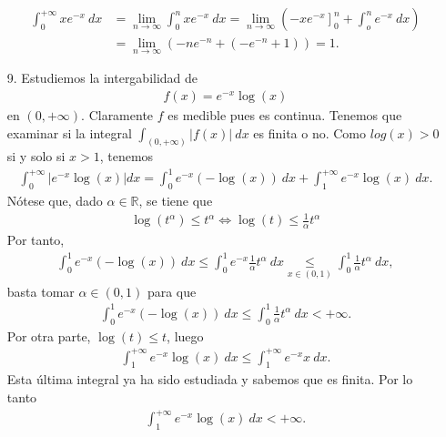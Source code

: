 \begin{ejemplo}
\begin{enumerate}
\begin{align*}
                  \int_{0}^{+\infty}{xe^{-x} \ dx} & = \lim_{n \to \infty}{\int_{0}^{n}{xe^{-x} \ dx}} = \lim_{n \to \infty} {\left( \left. -xe^{-x}\right]_0^n + \int_{o}^{n}{e^{-x} \ dx} \right)} \\
                                                   & = \lim_{n \to \infty}{(-ne^{-n} + (-e^{-n}+1))} = 1.
              \end{align*}
        \item[9.] Estudiemos la intergabilidad de
              \begin{align*}
                  f(x) = e^{-x}\log(x)
              \end{align*}
              en $(0,+\infty)$. Claramente $f$ es medible pues es continua. Tenemos que examinar si la integral $\int_{(0,+\infty)}{|f(x)| \ dx}$ es finita o no. Como $log(x) > 0$ si y solo si $x > 1$, tenemos
              \begin{align*}
                  \int_{0}^{+\infty}{|e^{-x}\log(x)| dx} = \int_{0}^{1}{e^{-x}(-\log(x)) \ dx} + \int_{1}^{+\infty}{e^{-x}\log(x) \ dx}.
              \end{align*}
              Nótese que, dado $\alpha \in \mathbb{R}$, se tiene que
              \begin{align*}
                  \log(t^{\alpha}) \leq t^{\alpha} \Longleftrightarrow \log(t) \leq \frac{1}{\alpha}t^{\alpha}
              \end{align*}
              Por tanto,
              \begin{align*}
                  \int_{0}^{1}{e^{-x}(-\log(x)) \ dx} \leq \int_{0}^{1}{e^{-x}\frac{1}{\alpha}t^{\alpha}\ dx} \underset{x \in (0,1)}{\leq} \int_{0}^{1}{\frac{1}{\alpha}t^{\alpha}\ dx},
              \end{align*}
              basta tomar $\alpha \in (0,1)$ para que
              \begin{align*}
                  \int_{0}^{1}{e^{-x}(-\log(x)) \ dx} \leq \int_{0}^{1}{\frac{1}{\alpha}t^{\alpha}\ dx} < +\infty.
              \end{align*}
              Por otra parte, $\log(t) \leq t$, luego
              \begin{align*}
                  \int_{1}^{+\infty}{e^{-x}\log(x) \ dx} \leq \int_{1}^{+\infty}{e^{-x}x \ dx}.
              \end{align*}
              Esta última integral ya ha sido estudiada y sabemos que es finita. Por lo tanto
              \begin{align*}
                  \int_{1}^{+\infty}{e^{-x}\log(x) \ dx} < +\infty.

\end{align*}
\end{enumerate}
\end{ejemplo}
